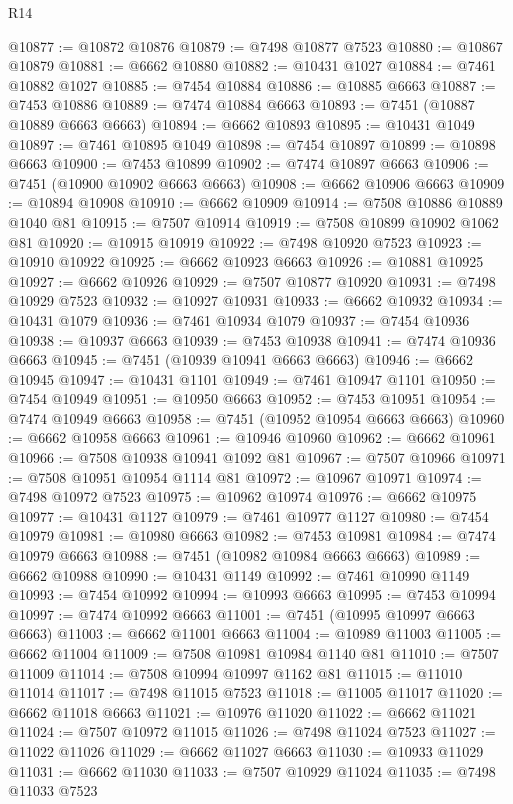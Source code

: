 \begin{lexlean}{R14}
\begin{coremodule}
@10877 := @10872 @10876
@10879 := @7498 @10877 @7523
@10880 := @10867 @10879
@10881 := @6662 @10880
@10882 := @10431 @1027
@10884 := @7461 @10882 @1027
@10885 := @7454 @10884
@10886 := @10885 @6663
@10887 := @7453 @10886
@10889 := @7474 @10884 @6663
@10893 := @7451 (@10887 @10889 @6663 @6663)
@10894 := @6662 @10893
@10895 := @10431 @1049
@10897 := @7461 @10895 @1049
@10898 := @7454 @10897
@10899 := @10898 @6663
@10900 := @7453 @10899
@10902 := @7474 @10897 @6663
@10906 := @7451 (@10900 @10902 @6663 @6663)
@10908 := @6662 @10906 @6663
@10909 := @10894 @10908
@10910 := @6662 @10909
@10914 := @7508 @10886 @10889 @1040 @81
@10915 := @7507 @10914
@10919 := @7508 @10899 @10902 @1062 @81
@10920 := @10915 @10919
@10922 := @7498 @10920 @7523
@10923 := @10910 @10922
@10925 := @6662 @10923 @6663
@10926 := @10881 @10925
@10927 := @6662 @10926
@10929 := @7507 @10877 @10920
@10931 := @7498 @10929 @7523
@10932 := @10927 @10931
@10933 := @6662 @10932
@10934 := @10431 @1079
@10936 := @7461 @10934 @1079
@10937 := @7454 @10936
@10938 := @10937 @6663
@10939 := @7453 @10938
@10941 := @7474 @10936 @6663
@10945 := @7451 (@10939 @10941 @6663 @6663)
@10946 := @6662 @10945
@10947 := @10431 @1101
@10949 := @7461 @10947 @1101
@10950 := @7454 @10949
@10951 := @10950 @6663
@10952 := @7453 @10951
@10954 := @7474 @10949 @6663
@10958 := @7451 (@10952 @10954 @6663 @6663)
@10960 := @6662 @10958 @6663
@10961 := @10946 @10960
@10962 := @6662 @10961
@10966 := @7508 @10938 @10941 @1092 @81
@10967 := @7507 @10966
@10971 := @7508 @10951 @10954 @1114 @81
@10972 := @10967 @10971
@10974 := @7498 @10972 @7523
@10975 := @10962 @10974
@10976 := @6662 @10975
@10977 := @10431 @1127
@10979 := @7461 @10977 @1127
@10980 := @7454 @10979
@10981 := @10980 @6663
@10982 := @7453 @10981
@10984 := @7474 @10979 @6663
@10988 := @7451 (@10982 @10984 @6663 @6663)
@10989 := @6662 @10988
@10990 := @10431 @1149
@10992 := @7461 @10990 @1149
@10993 := @7454 @10992
@10994 := @10993 @6663
@10995 := @7453 @10994
@10997 := @7474 @10992 @6663
@11001 := @7451 (@10995 @10997 @6663 @6663)
@11003 := @6662 @11001 @6663
@11004 := @10989 @11003
@11005 := @6662 @11004
@11009 := @7508 @10981 @10984 @1140 @81
@11010 := @7507 @11009
@11014 := @7508 @10994 @10997 @1162 @81
@11015 := @11010 @11014
@11017 := @7498 @11015 @7523
@11018 := @11005 @11017
@11020 := @6662 @11018 @6663
@11021 := @10976 @11020
@11022 := @6662 @11021
@11024 := @7507 @10972 @11015
@11026 := @7498 @11024 @7523
@11027 := @11022 @11026
@11029 := @6662 @11027 @6663
@11030 := @10933 @11029
@11031 := @6662 @11030
@11033 := @7507 @10929 @11024
@11035 := @7498 @11033 @7523

\end{coremodule}
\end{lexlean}
